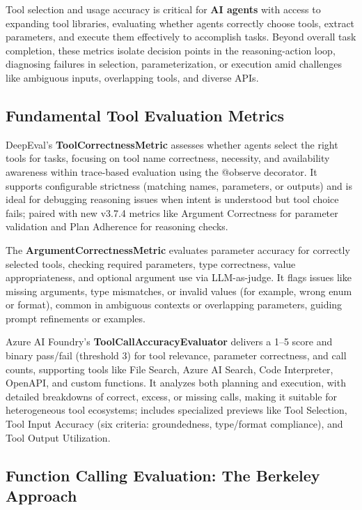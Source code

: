 \begin{TNtwocol}
Tool selection and usage accuracy is critical for \textbf{AI agents} with access to expanding tool libraries, evaluating whether agents correctly choose tools, extract parameters, and execute them effectively to accomplish tasks. Beyond overall task completion, these metrics isolate decision points in the reasoning-action loop, diagnosing failures in selection, parameterization, or execution amid challenges like ambiguous inputs, overlapping tools, and diverse APIs.

\subsection*{Fundamental Tool Evaluation Metrics}

DeepEval’s \textbf{ToolCorrectnessMetric} assesses whether agents select the right tools for tasks, focusing on tool name correctness, necessity, and availability awareness within trace-based evaluation using the @observe decorator. It supports configurable strictness (matching names, parameters, or outputs) and is ideal for debugging reasoning issues when intent is understood but tool choice fails; paired with new v3.7.4 metrics like Argument Correctness for parameter validation and Plan Adherence for reasoning checks.
​

The \textbf{ArgumentCorrectnessMetric} evaluates parameter accuracy for correctly selected tools, checking required parameters, type correctness, value appropriateness, and optional argument use via LLM-as-judge. It flags issues like missing arguments, type mismatches, or invalid values (for example, wrong enum or format), common in ambiguous contexts or overlapping parameters, guiding prompt refinements or examples.
​

Azure AI Foundry’s \textbf{ToolCallAccuracyEvaluator} delivers a 1–5 score and binary pass/fail (threshold 3) for tool relevance, parameter correctness, and call counts, supporting tools like File Search, Azure AI Search, Code Interpreter, OpenAPI, and custom functions. It analyzes both planning and execution, with detailed breakdowns of correct, excess, or missing calls, making it suitable for heterogeneous tool ecosystems; includes specialized previews like Tool Selection, Tool Input Accuracy (six criteria: groundedness, type/format compliance), and Tool Output Utilization.
​

\subsection*{Function Calling Evaluation: The Berkeley Approach}


\end{TNtwocol}
